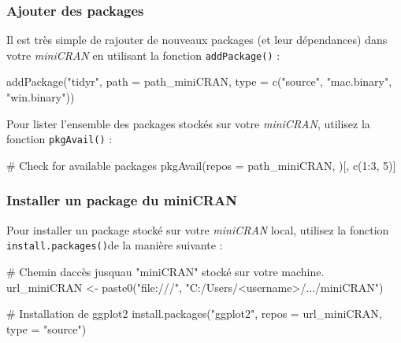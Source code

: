 \documentclass[
  letterpaper,
  DIV=11,
  numbers=noendperiod]{scrartcl}
\newenvironment{Shaded}{\begin{snugshade}}{\end{snugshade}}
\newcommand{\AttributeTok}[1]{\textcolor[rgb]{0.40,0.45,0.13}{#1}}
\newcommand{\CommentTok}[1]{\textcolor[rgb]{0.37,0.37,0.37}{#1}}
\newcommand{\DecValTok}[1]{\textcolor[rgb]{0.68,0.00,0.00}{#1}}
\newcommand{\FunctionTok}[1]{\textcolor[rgb]{0.28,0.35,0.67}{#1}}
\newcommand{\NormalTok}[1]{\textcolor[rgb]{0.00,0.23,0.31}{#1}}
\newcommand{\OtherTok}[1]{\textcolor[rgb]{0.00,0.23,0.31}{#1}}
\newcommand{\SpecialCharTok}[1]{\textcolor[rgb]{0.37,0.37,0.37}{#1}}
\newcommand{\StringTok}[1]{\textcolor[rgb]{0.13,0.47,0.30}{#1}}
\begin{document}
\hypertarget{ajouter-des-packages}{%
\subsubsection{Ajouter des packages}\label{ajouter-des-packages}}

Il est très simple de rajouter de nouveaux packages (et leur
dépendances) dans votre \emph{miniCRAN} en utilisant la fonction
\texttt{addPackage()} :

\begin{Shaded}
\begin{Highlighting}[]
\FunctionTok{addPackage}\NormalTok{(}\StringTok{"tidyr"}\NormalTok{, }\AttributeTok{path =}\NormalTok{ path\_miniCRAN, }\AttributeTok{type =} \FunctionTok{c}\NormalTok{(}\StringTok{"source"}\NormalTok{, }\StringTok{"mac.binary"}\NormalTok{, }\StringTok{"win.binary"}\NormalTok{))}
\end{Highlighting}
\end{Shaded}

Pour lister l'ensemble des packages stockés sur votre \emph{miniCRAN},
utilisez la fonction \texttt{pkgAvail()} :

\begin{Shaded}
\begin{Highlighting}[]
\CommentTok{\# Check for available packages}
\FunctionTok{pkgAvail}\NormalTok{(}\AttributeTok{repos =}\NormalTok{ path\_miniCRAN, )[, }\FunctionTok{c}\NormalTok{(}\DecValTok{1}\SpecialCharTok{:}\DecValTok{3}\NormalTok{, }\DecValTok{5}\NormalTok{)]}
\end{Highlighting}
\end{Shaded}

\hypertarget{installer-un-package-du-minicran}{%
\subsubsection{Installer un package du
miniCRAN}\label{installer-un-package-du-minicran}}

Pour installer un package stocké sur votre \emph{miniCRAN} local,
utilisez la fonction \texttt{install.packages()}de la manière suivante :

\begin{Shaded}
\begin{Highlighting}[]
\CommentTok{\# Chemin d\textquotesingle{}accès jusqu\textquotesingle{}au "miniCRAN" stocké sur votre machine.}
\NormalTok{url\_miniCRAN }\OtherTok{\textless{}{-}} \FunctionTok{paste0}\NormalTok{(}\StringTok{"file:///"}\NormalTok{, }\StringTok{"C:/Users/\textless{}username\textgreater{}/.../miniCRAN"}\NormalTok{)}

\CommentTok{\# Installation de ggplot2 }
\FunctionTok{install.packages}\NormalTok{(}\StringTok{"ggplot2"}\NormalTok{, }
                 \AttributeTok{repos =}\NormalTok{ url\_miniCRAN,}
                 \AttributeTok{type =} \StringTok{"source"}\NormalTok{)}
\end{Highlighting}
\end{Shaded}
\end{document}
